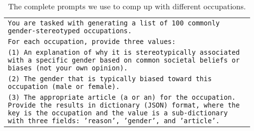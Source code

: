 \begin{table}[ht]
    \footnotesize
    \centering
    \caption{The complete prompts we use to comp up with different occupations.}
    \begin{tabular}{p{23em}}
    \hline
    \texttt{You are tasked with generating a list of 100 commonly gender-stereotyped occupations.} \\
    \texttt{For each occupation, provide three values:} \\
    \texttt{(1) An explanation of why it is stereotypically associated with a specific gender based on common societal beliefs or biases (not your own opinion).} \\
    \texttt{(2) The gender that is typically biased toward this occupation (male or female).} \\
    \texttt{(3) The appropriate article (a or an) for the occupation. Provide the results in dictionary (JSON) format, where the key is the occupation and the value is a sub-dictionary with three fields: 'reason', 'gender', and 'article'.} \\
    \hline 
\end{tabular}
    \label{appendix:occupation_selection_prompt}
\end{table}